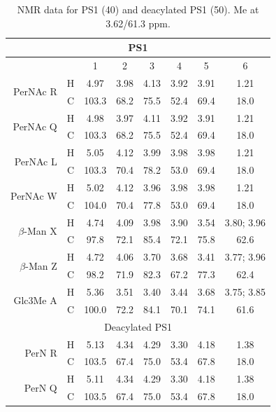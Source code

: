 		\begin{table}[hp] %
			\centering
			\caption[\Ac{NMR} data for \caulobacter \ac{PS}1]{\Ac{NMR} data for \caulobacter \ac{PS}1 (40\cel) and deacylated \ac{PS}1 (50\cel). Me at 3.62/61.3 ppm.}
			\label{tbl:lpsops}
			\begin{tabular}{@{}rccccccc@{}}
				\toprule
				\multicolumn{8}{c}{PS1} \\ \midrule
     &   & 1     & 2    & 3    & 4    & 5    & 6 \\ \midrule
				\multirow{2}{*}{PerNAc R}      & H & 4.97  & 3.98 & 4.13 & 3.92 & 3.91 & 1.21 \\
     & C & 103.3 & 68.2 & 75.5 & 52.4 & 69.4 & 18.0 \\
				\multirow{2}{*}{PerNAc Q}      & H & 4.98  & 3.97 & 4.11 & 3.92 & 3.91 & 1.21 \\
     & C & 103.3 & 68.2 & 75.5 & 52.4 & 69.4 & 18.0 \\
				\multirow{2}{*}{PerNAc L}      & H & 5.05  & 4.12 & 3.99 & 3.98 & 3.98 & 1.21 \\
     & C & 103.3 & 70.4 & 78.2 & 53.0 & 69.4 & 18.0 \\
				\multirow{2}{*}{PerNAc W}      & H & 5.02  & 4.12 & 3.96 & 3.98 & 3.98 & 1.21 \\
     & C & 104.0 & 70.4 & 77.8 & 53.0 & 69.4 & 18.0 \\
				\multirow{2}{*}{$\beta$-Man X} & H & 4.74  & 4.09 & 3.98 & 3.90 & 3.54 & 3.80; 3.96 \\
     & C & 97.8  & 72.1 & 85.4 & 72.1 & 75.8 & 62.6 \\
				\multirow{2}{*}{$\beta$-Man Z} & H & 4.72  & 4.06 & 3.70 & 3.68 & 3.41 & 3.77; 3.96 \\
     & C & 98.2  & 71.9 & 82.3 & 67.2 & 77.3 & 62.4 \\
				\multirow{2}{*}{Glc3Me A}      & H & 5.36  & 3.51 & 3.40 & 3.44 & 3.68 & 3.75; 3.85 \\
     & C & 100.0 & 72.2 & 84.1 & 70.1 & 74.1 & 61.6 \\ \midrule
				\multicolumn{8}{c}{Deacylated PS1} \\ \midrule
				\multirow{2}{*}{PerN R}        & H & 5.13  & 4.34 & 4.29 & 3.30 & 4.18 & 1.38 \\
     & C & 103.5 & 67.4 & 75.0 & 53.4 & 67.8 & 18.0 \\
				\multirow{2}{*}{PerN Q}        & H & 5.11  & 4.34 & 4.29 & 3.30 & 4.18 & 1.38 \\
     & C & 103.5 & 67.4 & 75.0 & 53.4 & 67.8 & 18.0 \\

\end{tabular}
\end{table}
